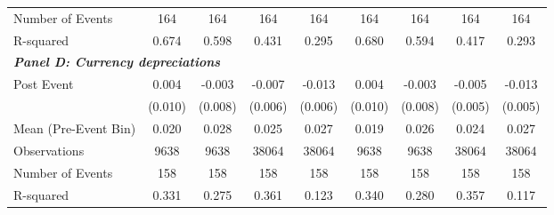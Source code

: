 {\begin{tabular}{l*{8}{c}}
Number of Events&         164         &         164         &         164         &         164         &         164         &         164         &         164         &         164         \\
R-squared   &       0.674         &       0.598         &       0.431         &       0.295         &       0.680         &       0.594         &       0.417         &       0.293         \\
\bottomrule
\multicolumn{9}{l}{\textbf{\textit{Panel D: Currency depreciations}}} \\
Post Event  &       0.004         &      -0.003         &      -0.007         &      -0.013\sym{**} &       0.004         &      -0.003         &      -0.005         &      -0.013\sym{**} \\
&     (0.010)         &     (0.008)         &     (0.006)         &     (0.006)         &     (0.010)         &     (0.008)         &     (0.005)         &     (0.005)         \\
\midrule
Mean (Pre-Event Bin)&       0.020         &       0.028         &       0.025         &       0.027         &       0.019         &       0.026         &       0.024         &       0.027         \\
Observations&        9638         &        9638         &       38064         &       38064         &        9638         &        9638         &       38064         &       38064         \\
Number of Events&         158         &         158         &         158         &         158         &         158         &         158         &         158         &         158         \\
R-squared   &       0.331         &       0.275         &       0.361         &       0.123         &       0.340         &       0.280         &       0.357         &       0.117         \\
\bottomrule
\end{tabular}
}
